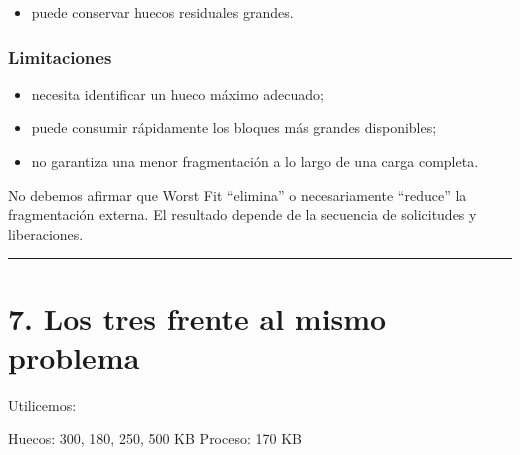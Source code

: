 \documentclass[
  spanish,
  letterpaper,
]{scrbook}
\newenvironment{Shaded}{\begin{snugshade}}{\end{snugshade}}
\newcommand{\NormalTok}[1]{\textcolor[rgb]{0.00,0.23,0.31}{#1}}
\providecommand{\tightlist}{%
  \setlength{\itemsep}{0pt}\setlength{\parskip}{0pt}}
\begin{document}
\begin{itemize}
\tightlist
\item
  puede conservar huecos residuales grandes.
\end{itemize}

\subsection{Limitaciones}\label{limitaciones-7}

\begin{itemize}
\tightlist
\item
  necesita identificar un hueco máximo adecuado;
\item
  puede consumir rápidamente los bloques más grandes disponibles;
\item
  no garantiza una menor fragmentación a lo largo de una carga completa.
\end{itemize}

\begin{tcolorbox}[enhanced jigsaw, arc=.35mm, bottomrule=.15mm, bottomtitle=1mm, breakable, colback=white, colbacktitle=quarto-callout-warning-color!10!white, colframe=quarto-callout-warning-color-frame, coltitle=black, left=2mm, leftrule=.75mm, opacityback=0, opacitybacktitle=0.6, rightrule=.15mm, title=\textcolor{quarto-callout-warning-color}{\faExclamationTriangle}\hspace{0.5em}{Evitemos una conclusión apresurada}, titlerule=0mm, toprule=.15mm, toptitle=1mm]

No debemos afirmar que Worst Fit ``elimina'' o necesariamente ``reduce''
la fragmentación externa. El resultado depende de la secuencia de
solicitudes y liberaciones.

\end{tcolorbox}

\begin{center}\rule{0.5\linewidth}{0.5pt}\end{center}


\chapter{7. Los tres frente al mismo
problema}\label{los-tres-frente-al-mismo-problema-1}

Utilicemos:

\begin{Shaded}
\begin{Highlighting}[]
\NormalTok{Huecos: 300, 180, 250, 500 KB}
\NormalTok{Proceso: 170 KB}
\end{Highlighting}
\end{Shaded}
\end{document}

